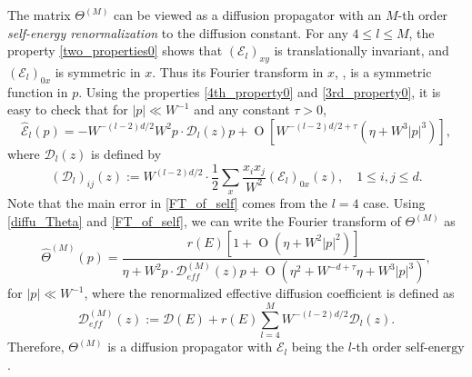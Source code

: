 \documentclass{article}
\newcommand{\1}{\mathds{1}}
\numberwithin{equation}{section}
\newcommand{\be}{\begin{equation}}
\newcommand{\ee}{\end{equation}}
\renewcommand{\cal}{\mathcal}
\newcommand{\wh}{\widehat}
\renewcommand{\leq}{\leqslant}
\renewcommand{\le}{\leq}
\newcommand{\E}{\mathbb{E}}
\newcommand{\self}{\text{self-energy}}
\newcommand{\renormal}{\text{self-energy renormalization}}
\DeclareMathOperator{\OO}{O}
\theoremstyle{plain} %
\theoremstyle{remark}
\newcommand{\cor}{\color{red}}
\newcommand{\Sele}{{\mathcal E}}
\newcommand{\hty}[1]{{\cor (ht: #1) }}
\begin{document}
The matrix $\Theta^{(M)}$ can be viewed as a diffusion propagator with an $M$-th order \emph{self-energy renormalization} to the diffusion constant.  
For any $4\le l \le M$, the property \eqref{two_properties0} shows that $(\Sele_l)_{xy}$ is translationally invariant, and $(\Sele_l)_{0x}$ is symmetric in $x$. Thus its Fourier transform in $x$, %
\smash{$\wh\Sele_l(p)$}, is a symmetric function in $p$. 
Using the properties \eqref{4th_property0} and \eqref{3rd_property0}, it is easy to check that for $|p|\ll W^{-1}$ and any constant $\tau>0$, %
\be\label{FT_of_self}
\wh\Sele_l(p)=-W^{-(l-2)d/2}   W^2 p\cdot \cal D_l(z) p + \OO\left[W^{-(l-2)d/2+\tau} \left(\eta + W^3|p|^3\right)\right], 
\ee
where $\cal D_l(z)$ is defined by %
$$ (\cal D_l)_{ij} (z):=W^{(l-2)d/2}\cdot \frac{1}{2}\sum_{x}\frac{x_i x_j}{W^2}(\Sele_l)_{0x}(z),\quad 1\le i, j \le d. $$
Note that %
the main error in \eqref{FT_of_self} comes from the $l=4$ case. Using \eqref{diffu_Theta} and \eqref{FT_of_self}, we can write the Fourier transform of $\Theta^{(M)}$ as %
\be\label{TM}
\wh \Theta^{(M)}(p) = \frac{r(E)\left[1+\OO(\eta+W^2 |p|^2)\right]}{\eta+ W^2 p\cdot \cal D_{eff}^{(M)}(z) p+ \OO\left( \eta^2+ W^{-d+\tau} \eta + W^3|p|^3\right)},
\ee
for $|p|\ll W^{-1}$, where the renormalized effective diffusion coefficient is defined as
\be  \cal D_{eff}^{(M)}(z):= \cal D(E) + r(E) \sum_{l=4}^M W^{-(l-2)d/2}\cal D_l(z).\ee
Therefore, $\Theta^{(M)}$ is a diffusion propagator with $\Sele_l$ being the $l$-th order $\self$. %
\end{document}
